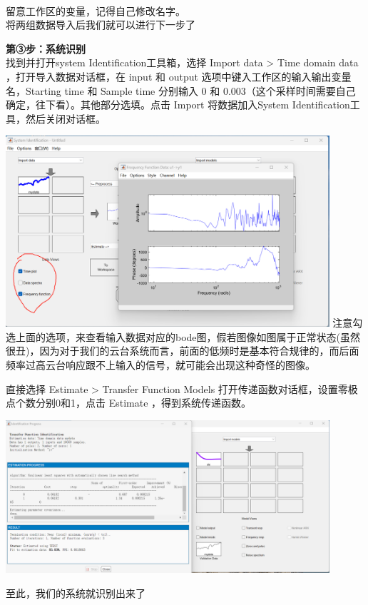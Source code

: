 \documentclass[UTF8,a4paper,12pt]{ctexart}
\begin{document}
\begin{flushleft}
\begin{flushleft}
        \\留意工作区的变量，记得自己修改名字。
        \\将两组数据导入后我们就可以进行下一步了
      \end{flushleft}
      \begin{flushleft}
        \textbf{第③步：系统识别}\\
        找到并打开system Identification工具箱，选择 Import data > Time domain data ，打开导入数据对话框，在 input 和 output 选项中键入工作区的输入输出变量名，Starting time 和 Sample time 分别输入 0 和 0.003（这个采样时间需要自己确定，往下看）。其他部分选填。点击 Import 将数据加入System Identification工具，然后关闭对话框。
      \end{flushleft}
      \begin{flushleft}
        
        \par \includegraphics[width=12cm]{picture/bode.png}
        注意勾选上面的选项，来查看输入数据对应的bode图，假若图像如图属于正常状态(虽然很丑)，因为对于我们的云台系统而言，前面的低频时是基本符合规律的，而后面频率过高云台响应跟不上输入的信号，就可能会出现这种奇怪的图像。
      \end{flushleft}
      \begin{flushleft}
        直接选择 Estimate > Transfer Function Models 打开传递函数对话框，设置零极点个数分别0和1，点击 Estimate ，得到系统传递函数。
        \par \includegraphics[width=12cm]{picture/identify_result.png}
      \end{flushleft}
      至此，我们的系统就识别出来了
    \end{flushleft}
    
\end{document}
